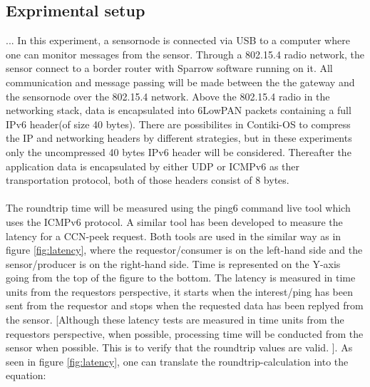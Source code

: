 \subsection{Exprimental setup}
...
In this experiment, a sensornode is connected via USB to a computer where one can monitor messages from the sensor. Through a 802.15.4 radio network, the sensor connect to a border router with Sparrow software running on it. All communication and message passing will be made between the the gateway and the sensornode over the 802.15.4 network. Above the 802.15.4 radio in the networking stack, data is encapsulated into 6LowPAN packets containing a full IPv6 header(of size 40 bytes). There are possibilites in Contiki-OS to compress the IP and networking headers by different strategies, but in these experiments only the uncompressed 40 bytes IPv6 header will be considered. Thereafter the application data is encapsulated by either UDP or ICMPv6 as ther transportation protocol, both of those headers consist of 8 bytes. 
\\\\
The roundtrip time will be measured using the ping6 command live tool which uses the ICMPv6 protocol. A similar tool has been developed to measure the latency for a CCN-peek request. Both tools are used in the similar way as in figure \ref{fig:latency}, where the requestor/consumer is on the left-hand side and the sensor/producer is on the right-hand side. Time is represented on the Y-axis going from the top of the figure to the bottom. 
The latency is measured in time units from the requestors perspective, it starts when the interest/ping has been sent from the requestor and stops when the requested data has been replyed from the sensor. [Although these latency tests are measured in time units from the requestors perspective, when possible, processing time will be conducted from the sensor when possible. This is to verify that the roundtrip values are valid. ]. As seen in figure \ref{fig:latency}, one can translate the roundtrip-calculation into the equation:
